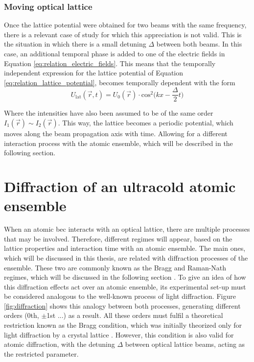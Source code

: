 \subsubsection{Moving optical lattice}

Once the lattice potential were obtained for two beams with the same frequency, there is a relevant case of study for which this appreciation is not valid. This is the situation in which there is a small detuning $\Delta$ between both beams. In this case, an additional temporal phase is added to one of the electric fields in Equation \eqref{eq:relation_electric_fields}. This means that the temporally independent expression for the lattice potential of Equation \eqref{eq:relation_lattice_potential}, becomes temporally dependent with the form
\begin{equation}\label{eq:relation_moving_lattice_potential}
	U_{\text{lat}}(\vec{r},t) = U_{0}(\vec{r}) \cdot \text{cos}^2\bigg(kx-\frac{\Delta}{2}t\bigg)
\end{equation} 

Where the intensities have also been assumed to be of the same order $I_{1}(\vec{r}) \sim I_{2}(\vec{r})$. This way, the lattice becomes a periodic potential, which moves along the beam propagation axis with time. Allowing for a different interaction process with the atomic ensemble, which will be described in the following section.


\section{Diffraction of an ultracold atomic ensemble}

When an atomic \ac{bec} interacts with an optical lattice, there are multiple processes that may be involved. Therefore, different regimes will appear, based on the lattice properties and interaction time with an atomic ensemble. The main ones, which will be discussed in this thesis, are related with diffraction processes of the ensemble. These two are commonly known as the Bragg and Raman-Nath regimes, which will be discussed in the following section \cite{Mueller2008,Ovchinnikov1999}. To give an idea of how this diffraction effects act over an atomic ensemble, its experimental set-up must be considered analogous to the well-known process of light diffraction. Figure \ref{fig:diffraction} shows this analogy between both processes, generating different orders (0th, $\pm$1st ...) as a result. All these orders must fulfil a theoretical restriction known as the Bragg condition, which was initially theorized only for light diffraction by a crystal lattice \cite{Bragg1913}. However, this condition is also valid for atomic diffraction, with the detuning $\Delta$ between optical lattice beams, acting as the restricted parameter.



